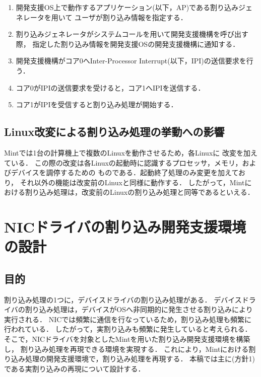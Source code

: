 \documentclass[submit,techreq,noauthor,dvipdfmx]{ipsj}
\begin{document}
\begin{enumerate}
    \item 
        開発支援OS上で動作するアプリケーション(以下，AP)である割り込みジェネレータを用いて
        ユーザが割り込み情報を指定する．
    \item 
        割り込みジェネレータがシステムコールを用いて開発支援機構を呼び出す際，
        指定した割り込み情報を開発支援OSの開発支援機構に通知する．   
    \item 
        開発支援機構がコア0へInter-Processor Interrupt(以下，IPI)の送信要求を行う．
    \item 
        コア0がIPIの送信要求を受けると，コア1へIPIを送信する．
    \item 
        コア1がIPIを受信すると割り込み処理が開始する．
\end{enumerate}

\subsection{Linux改変による割り込み処理の挙動への影響}\label{sec:impact_to_linux}

Mintでは1台の計算機上で複数のLinuxを動作させるため，各Linuxに
改変を加えている\cite{kitagawa}．
この際の改変は各Linuxの起動時に認識するプロセッサ，メモリ，およびデバイスを調停するための
ものである．起動終了処理のみ変更を加えており，
それ以外の機能は改変前のLinuxと同様に動作する．
したがって，Mintにおける割り込み処理は，改変前のLinuxの割り込み処理と同等であるといえる．

\section{NICドライバの割り込み開発支援環境の設計}\label{chap:design_of_debugging_invironment_of_NIC}

\subsection{目的}\label{sec:purpose}

割り込み処理の1つに，デバイスドライバの割り込み処理がある．
デバイスドライバの割り込み処理は，デバイスがOSへ非同期的に発生させる割り込みにより
実行される．
NICでは頻繁に通信を行なっているため，割り込み処理も頻繁に行われている．
したがって，実割り込みも頻繁に発生していると考えられる．
そこで，NICドライバを対象としたMintを用いた割り込み開発支援環境を構築し，
割り込み処理を再現できる環境を実現する．
これにより，Mintにおける割り込み処理の開発支援環境で，割り込み処理を再現する．
本稿では主に(方針1)である実割り込みの再現について設計する．
\end{document}

